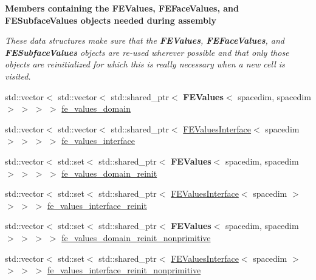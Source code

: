 \begin{Indent}{\bf Members containing the F\+E\+Values, F\+E\+Face\+Values, and F\+E\+Subface\+Values objects needed during assembly}\par
{\em These data structures make sure that the {\bf F\+E\+Values}, {\bf F\+E\+Face\+Values}, and {\bf F\+E\+Subface\+Values} objects are re-\/used wherever possible and that only those objects are reinitialized for which this is really necessary when a new cell is visited. }\begin{DoxyCompactItemize}
\item 
std\+::vector$<$ std\+::vector$<$ std\+::shared\+\_\+ptr$<$ {\bf F\+E\+Values}$<$ spacedim, spacedim $>$ $>$ $>$ $>$ \hyperlink{class_assembly_helper_a904a24f53b66e1c1ef89f1bb7989eb32}{fe\+\_\+values\+\_\+domain}
\item 
std\+::vector$<$ std\+::vector$<$ std\+::shared\+\_\+ptr$<$ \hyperlink{class_f_e_values_interface}{F\+E\+Values\+Interface}$<$ spacedim $>$ $>$ $>$ $>$ \hyperlink{class_assembly_helper_ae1e2643696005415d78421882ca80e8e}{fe\+\_\+values\+\_\+interface}
\item 
std\+::vector$<$ std\+::set$<$ std\+::shared\+\_\+ptr$<$ {\bf F\+E\+Values}$<$ spacedim, spacedim $>$ $>$ $>$ $>$ \hyperlink{class_assembly_helper_a28b58551c6afc68c7beaaa2604bc6e92}{fe\+\_\+values\+\_\+domain\+\_\+reinit}
\item 
std\+::vector$<$ std\+::set$<$ std\+::shared\+\_\+ptr$<$ \hyperlink{class_f_e_values_interface}{F\+E\+Values\+Interface}$<$ spacedim $>$ $>$ $>$ $>$ \hyperlink{class_assembly_helper_ac9789c5a00867744dd906b85580e3091}{fe\+\_\+values\+\_\+interface\+\_\+reinit}
\item 
std\+::vector$<$ std\+::set$<$ std\+::shared\+\_\+ptr$<$ {\bf F\+E\+Values}$<$ spacedim, spacedim $>$ $>$ $>$ $>$ \hyperlink{class_assembly_helper_a3c592ef0a148753891cc3e03fd08324c}{fe\+\_\+values\+\_\+domain\+\_\+reinit\+\_\+nonprimitive}
\item 
std\+::vector$<$ std\+::set$<$ std\+::shared\+\_\+ptr$<$ \hyperlink{class_f_e_values_interface}{F\+E\+Values\+Interface}$<$ spacedim $>$ $>$ $>$ $>$ \hyperlink{class_assembly_helper_afaa20027ee539ca8d9c40c317127e471}{fe\+\_\+values\+\_\+interface\+\_\+reinit\+\_\+nonprimitive}
\end{DoxyCompactItemize}
\end{Indent}
